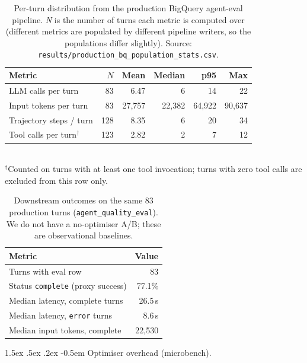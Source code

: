 \documentclass{article}
\makeatletter
\newcommand{\code}[1]{\texttt{\small #1}}
\renewcommand\paragraph{%
  \@startsection{paragraph}{4}{\z@}%
    {1.5ex \@plus.5ex \@minus.2ex}%
    {-0.5em}%
    {\normalfont\normalsize\bfseries}%
}
\makeatother
\begin{document}
\begin{table}[h]
  \caption{Per-turn distribution from the production BigQuery
  agent-eval pipeline. \emph{N} is the number of turns each metric is
  computed over (different metrics are populated by different
  pipeline writers, so the populations differ slightly). Source:
  \code{results/production\_bq\_population\_stats.csv}.}
  \label{tab:prod-bq-pop}
  \centering
  \small
  \begin{tabular}{lrrrrr}
    \toprule
    Metric & $N$ & Mean & Median & p95 & Max \\
    \midrule
    LLM calls per turn       & 83  &  6.47    & 6      & 14     & 22     \\
    Input tokens per turn    & 83  & 27{,}757 & 22{,}382 & 64{,}922 & 90{,}637 \\
    Trajectory steps / turn  & 128 &  8.35    & 6      & 20     & 34     \\
    Tool calls per turn$^{\dagger}$ & 123 &  2.82 & 2 & 7 & 12 \\
    \bottomrule
  \end{tabular}\\[2pt]
  {\footnotesize $^{\dagger}$Counted on turns with at least one tool
  invocation; turns with zero tool calls are excluded from this row only.}
\end{table}

\begin{table}[h]
  \caption{Downstream outcomes on the same 83 production turns
  (\code{agent\_quality\_eval}). We do not have a no-optimiser A/B;
  these are observational baselines.}
  \label{tab:prod-quality}
  \centering
  \small
  \begin{tabular}{lr}
    \toprule
    Metric & Value \\
    \midrule
    Turns with eval row                     & 83 \\
    Status \code{complete} (proxy success)  & 77.1\% \\
    Median latency, complete turns          & 26.5\,s \\
    Median latency, \code{error} turns      & 8.6\,s \\
    Median input tokens, complete           & 22{,}530 \\
    \bottomrule
  \end{tabular}
\end{table}

\paragraph{Optimiser overhead (microbench).}
\label{sec:microbench}
\end{document}
